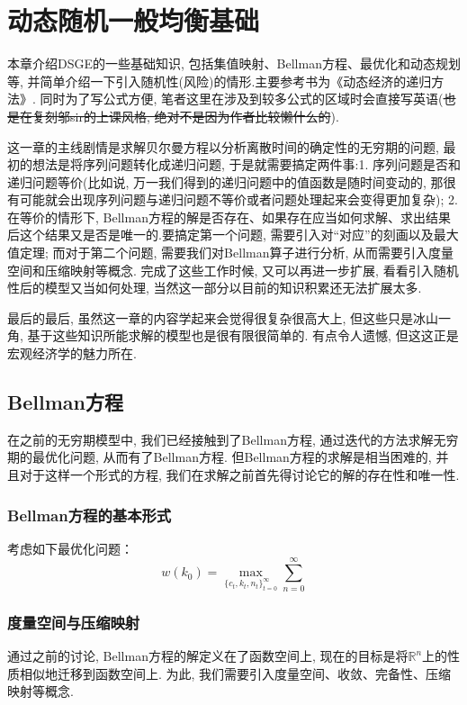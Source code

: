 \chapter{动态随机一般均衡基础}
本章介绍DSGE的一些基础知识, 包括集值映射、Bellman方程、最优化和动态规划等, 并简单介绍一下引入随机性(风险)的情形.主要参考书为《动态经济的递归方法》.
同时为了写公式方便, 笔者这里在涉及到较多公式的区域时会直接写英语(\sout{也是在复刻邬sir的上课风格, 绝对不是因为作者比较懒什么的}).

{\kaishu 这一章的主线剧情是求解贝尔曼方程以分析离散时间的确定性的无穷期的问题, 最初的想法是将序列问题转化成递归问题, 于是就需要搞定两件事:1. 序列问题是否和递归问题等价(比如说, 万一我们得到的递归问题中的值函数是随时间变动的, 那很有可能就会出现序列问题与递归问题不等价或者问题处理起来会变得更加复杂); 
2. 在等价的情形下, Bellman方程的解是否存在、如果存在应当如何求解、求出结果后这个结果又是否是唯一的.要搞定第一个问题, 需要引入对“对应”的刻画以及最大值定理; 而对于第二个问题, 需要我们对Bellman算子进行分析, 从而需要引入度量空间和压缩映射等概念.
完成了这些工作时候, 又可以再进一步扩展, 看看引入随机性后的模型又当如何处理, 当然这一部分以目前的知识积累还无法扩展太多.

最后的最后, 虽然这一章的内容学起来会觉得很复杂很高大上, 但这些只是冰山一角, 基于这些知识所能求解的模型也是很有限很简单的. 有点令人遗憾, 但这这正是宏观经济学的魅力所在.}

\section{Bellman方程}
在之前的无穷期模型中, 我们已经接触到了Bellman方程, 通过迭代的方法求解无穷期的最优化问题, 从而有了Bellman方程.
但Bellman方程的求解是相当困难的, 并且对于这样一个形式的方程, 我们在求解之前首先得讨论它的解的存在性和唯一性.
\subsection{Bellman方程的基本形式}
考虑如下最优化问题：
$$w(k_0)=\max_{\{c_t,k_t,n_t\}_{t=0}^{\infty}}\sum_{n=0}^{\infty}$$
\subsection{度量空间与压缩映射}
{\kaishu 通过之前的讨论, Bellman方程的解定义在了函数空间上, 现在的目标是将$\mathbb{R}^n$上的性质相似地迁移到函数空间上.
为此, 我们需要引入度量空间、收敛、完备性、压缩映射等概念.}
